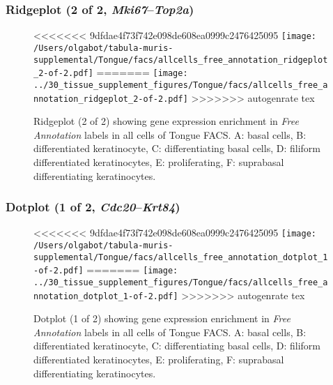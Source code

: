 \clearpage

\subsubsection{Ridgeplot (2 of 2, \emph{Mki67}--\emph{Top2a})}
\begin{figure}[h]
\centering
<<<<<<< 9dfdae4f73f742e098de608ea0999c2476425095
\texttt{[image: /Users/olgabot/tabula-muris-supplemental/Tongue/facs/allcells\_free\_annotation\_ridgeplot\_2-of-2.pdf]}
=======
\texttt{[image: ../30\_tissue\_supplement\_figures/Tongue/facs/allcells\_free\_annotation\_ridgeplot\_2-of-2.pdf]}
>>>>>>> autogenrate tex

\caption{ Ridgeplot (2 of 2)  showing gene expression enrichment in \emph{Free Annotation} labels in all cells of Tongue FACS. A: basal cells, B: differentiated keratinocyte, C: differentiating basal cells, D: filiform differentiated keratinocytes, E: proliferating, F: suprabasal differentiating keratinocytes.}
\end{figure}


\clearpage

\subsubsection{Dotplot (1 of 2, \emph{Cdc20}--\emph{Krt84})}
\begin{figure}[h]
\centering
<<<<<<< 9dfdae4f73f742e098de608ea0999c2476425095
\texttt{[image: /Users/olgabot/tabula-muris-supplemental/Tongue/facs/allcells\_free\_annotation\_dotplot\_1-of-2.pdf]}
=======
\texttt{[image: ../30\_tissue\_supplement\_figures/Tongue/facs/allcells\_free\_annotation\_dotplot\_1-of-2.pdf]}
>>>>>>> autogenrate tex

\caption{ Dotplot (1 of 2)  showing gene expression enrichment in \emph{Free Annotation} labels in all cells of Tongue FACS. A: basal cells, B: differentiated keratinocyte, C: differentiating basal cells, D: filiform differentiated keratinocytes, E: proliferating, F: suprabasal differentiating keratinocytes.}
\end{figure}


\clearpage

